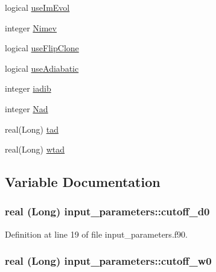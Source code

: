 \begin{DoxyCompactItemize}
logical \hyperlink{namespaceinput__parameters_a9672a1c90e65a2ecee350dd2dae64e03}{useImEvol}
\item 
integer \hyperlink{namespaceinput__parameters_ac0212885e38ab22a77411b20bec16420}{Nimev}
\item 
logical \hyperlink{namespaceinput__parameters_a504b6e2c93e4a4af47125d83d6e5d75d}{useFlipClone}
\item 
logical \hyperlink{namespaceinput__parameters_ac1165234d614ad278effaf2a7910888b}{useAdiabatic}
\item 
integer \hyperlink{namespaceinput__parameters_a2b1e4d8baaa62168d989002cf747b30b}{iadib}
\item 
integer \hyperlink{namespaceinput__parameters_a6e8306262594749651ff9230cb525363}{Nad}
\item 
real(Long) \hyperlink{namespaceinput__parameters_ab3ac3c45168fc6aafd02e70822154417}{tad}
\item 
real(Long) \hyperlink{namespaceinput__parameters_a8d452c8a3d45ee77279fc26867c74ed6}{wtad}
\end{DoxyCompactItemize}


\subsection{Variable Documentation}
\hypertarget{namespaceinput__parameters_a8e63bceb853ebd1124eda12568a0e57f}{
\subsubsection[{cutoff\_\-d0}]{\setlength{\rightskip}{0pt plus 5cm}real (Long) {\bf input\_\-parameters::cutoff\_\-d0}}}
\label{namespaceinput__parameters_a8e63bceb853ebd1124eda12568a0e57f}


Definition at line 19 of file input\_\-parameters.f90.

\hypertarget{namespaceinput__parameters_a3987174aef89a10227220b4e5bdecde6}{
\subsubsection[{cutoff\_\-w0}]{\setlength{\rightskip}{0pt plus 5cm}real (Long) {\bf input\_\-parameters::cutoff\_\-w0}}}
\label{namespaceinput__parameters_a3987174aef89a10227220b4e5bdecde6}


